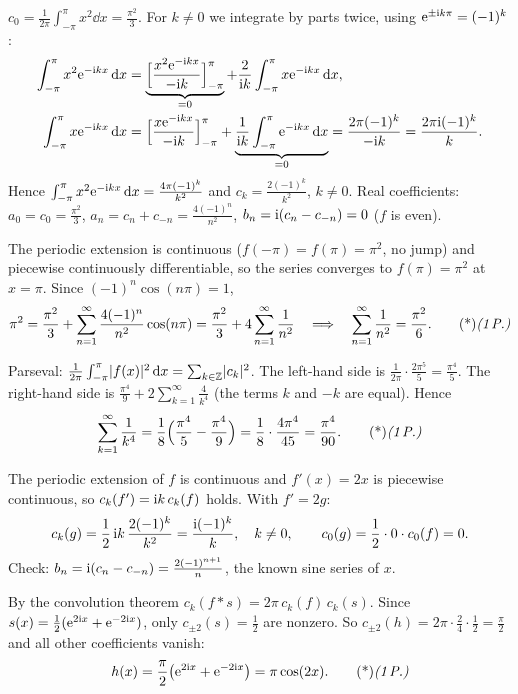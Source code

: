 \begin{solution}
 $c_0=\frac1{2\pi}\int_{-\pi}^\pi x^2\dd x=\frac{\pi^2}3$. 
For $k\neq0$ we integrate by parts twice, using $\mathrm{e}^{\pm\mathrm{i} k\pi}=(-1)^k$:
\begin{align*}
\int_{-\pi}^{\pi}x^2\mathrm{e}^{-\mathrm{i} kx}\,\mathrm{d} x&=\underbrace{\Big[\frac{x^2\mathrm{e}^{-\mathrm{i} kx}}{-\mathrm{i} k}\Big]_{-\pi}^{\pi}}_{=0}+\frac2{\mathrm{i} k}\int_{-\pi}^\pi x\mathrm{e}^{-\mathrm{i} kx}\,\mathrm{d} x,\\
\int_{-\pi}^\pi x\mathrm{e}^{-\mathrm{i} kx}\,\mathrm{d} x&=\Big[\frac{x\mathrm{e}^{-\mathrm{i} kx}}{-\mathrm{i} k}\Big]_{-\pi}^{\pi}+\underbrace{\frac1{\mathrm{i} k}\int_{-\pi}^\pi\mathrm{e}^{-\mathrm{i} kx}\,\mathrm{d} x}_{=0}=\frac{2\pi(-1)^k}{-\mathrm{i} k}=\frac{2\pi\mathrm{i}(-1)^k}{k}.
\end{align*}
Hence $\int_{-\pi}^\pi x^2\mathrm{e}^{-\mathrm{i} kx}\,\mathrm{d} x=\frac{4\pi(-1)^k}{k^2}$ and $c_k=\frac{2(-1)^k}{k^2}$, $k\neq0$. 
Real coefficients: $a_0=c_0=\frac{\pi^2}3$, $a_n=c_n+c_{-n}=\frac{4(-1)^n}{n^2}$, $b_n=\mathrm{i}(c_n-c_{-n})=0$ ($f$ is even). 

 The periodic extension is continuous ($f(-\pi)=f(\pi)=\pi^2$, no jump) and piecewise continuously differentiable, so the series converges to $f(\pi)=\pi^2$ at $x=\pi$. 
Since $(-1)^n\cos(n\pi)=1$,
\[
\pi^2=\frac{\pi^2}{3}+\sum_{n=1}^\infty\frac{4(-1)^n}{n^2}\cos(n\pi)=\frac{\pi^2}{3}+4\sum_{n=1}^\infty\frac1{n^2}
\quad\Longrightarrow\quad\sum_{n=1}^\infty\frac1{n^2}=\frac{\pi^2}6.\ptd{1}
\]

 Parseval: $\frac1{2\pi}\int_{-\pi}^\pi\lvert f(x)\rvert^2\,\mathrm{d} x=\sum_{k\in\mathbb{Z}}\lvert c_k\rvert^2$. The left-hand side is $\frac1{2\pi}\cdot\frac{2\pi^5}{5}=\frac{\pi^4}5$. 
The right-hand side is $\frac{\pi^4}9+2\sum_{k=1}^\infty\frac4{k^4}$ (the terms $k$ and $-k$ are equal). 
Hence
\[
\sum_{k=1}^\infty\frac1{k^4}=\frac18\Big(\frac{\pi^4}5-\frac{\pi^4}9\Big)=\frac18\cdot\frac{4\pi^4}{45}=\frac{\pi^4}{90}.\ptd{1}
\]

 The periodic extension of $f$ is continuous and $f'(x)=2x$ is piecewise continuous, so $c_k(f')=\mathrm{i} k\,c_k(f)$ holds. 
With $f'=2g$:
\[
c_k(g)=\frac12\,\mathrm{i} k\,\frac{2(-1)^k}{k^2}=\frac{\mathrm{i}(-1)^k}{k},\quad k\neq0,\qquad c_0(g)=\frac12\cdot0\cdot c_0(f)=0.
\]
Check: $b_n=\mathrm{i}(c_n-c_{-n})=\frac{2(-1)^{n+1}}{n}$, the known sine series of $x$. 

 By the convolution theorem $c_k(f\ast s)=2\pi\,c_k(f)\,c_k(s)$. Since $s(x)=\frac12(\mathrm{e}^{2\mathrm{i} x}+\mathrm{e}^{-2\mathrm{i} x})$, only $c_{\pm2}(s)=\frac12$ are nonzero. 
So $c_{\pm2}(h)=2\pi\cdot\frac{2}{4}\cdot\frac12=\frac\pi2$ and all other coefficients vanish:
\[
h(x)=\frac\pi2\big(\e^{2\iu x}+\e^{-2\iu x}\big)=\pi\cos(2x).\ptd{1}
\]


\end{solution}
